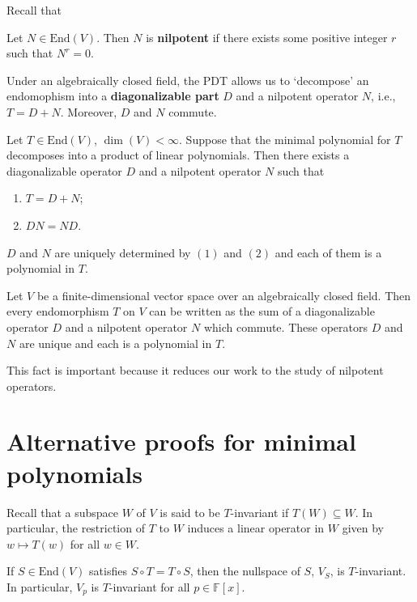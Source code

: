 Recall that

\begin{definition}
  Let $N \in \text{End}(V)$. Then $N$ is \textbf{nilpotent} if there exists some positive integer $r$ such that $N^r = 0$.
\end{definition}

Under an algebraically closed field, the PDT allows us to `decompose' an endomophism into a \textbf{diagonalizable part} $D$ and a nilpotent operator $N$, i.e., $T = D + N$. Moreover, $D$ and $N$ commute.

\begin{theorem}
  Let $T \in \text{End}(V)$, $\dim(V) < \infty$. Suppose that the minimal polynomial for $T$ decomposes into a product of linear polynomials. Then there exists a diagonalizable operator $D$ and a nilpotent operator $N$ such that 
  \begin{enumerate}
    \item $T = D + N$;
    \item $DN = ND$.
  \end{enumerate}

  $D$ and $N$ are uniquely determined by $(1)$ and $(2)$ and each of them is a polynomial in $T$.
\end{theorem}

\begin{corollary}
  Let $V$ be a finite-dimensional vector space over an algebraically closed field. Then every endomorphism $T$ on $V$ can be written as the sum of a diagonalizable operator $D$ and a nilpotent operator $N$ which commute. These operators $D$ and $N$ are unique and each is a polynomial in $T$.
\end{corollary}

This fact is important because it reduces our work to the study of nilpotent operators. 

\section{Alternative proofs for minimal polynomials}

Recall that a subspace $W$ of $V$ is said to be $T$-invariant if $T(W) \subseteq W$. In particular, the restriction of $T$ to $W$ induces a linear operator in $W$ given by $w \mapsto T(w)$ for all $w \in W$.

\begin{lemma}
	If $S \in \text{End}(V)$ satisfies $S \circ T = T \circ S$, then the nullspace of $S$, $V_S$, is $T$-invariant. In particular, $V_p$ is $T$-invariant for all $p \in \mathbb{F}[x]$.
\end{lemma}

